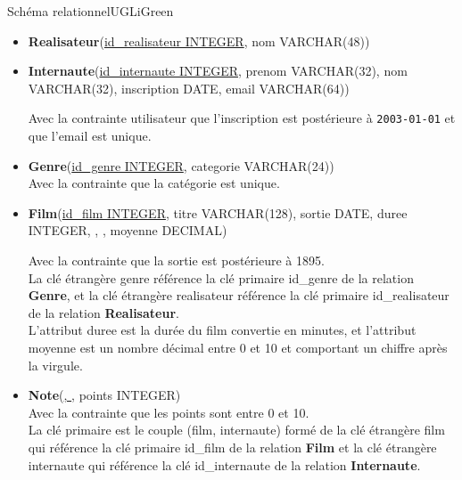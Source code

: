 \documentclass[a4paper,12pt,eval,firamath]{nsi}
\begin{document}
\begin{encadrecolore}{Schéma relationnel}{UGLiGreen}
    
    \begin{itemize}
        \item 	\textbf{Realisateur}(\uline{id\_realisateur INTEGER}, nom VARCHAR(48))\\
        \item 	\scriptsize\textbf{Internaute}(\uline{id\_internaute INTEGER}, prenom VARCHAR(32), nom VARCHAR(32), inscription DATE, email VARCHAR(64))\\\normalsize
              
              Avec la contrainte utilisateur que l'inscription est postérieure à \texttt{2003-01-01} et que l'email est unique.\\
        \item   \textbf{Genre}(\uline{id\_genre INTEGER}, categorie VARCHAR(24))\\
              
              Avec la contrainte que la catégorie est unique.\\
              
        \item  \scriptsize\textbf{Film}(\uline{id\_film INTEGER}, titre VARCHAR(128), sortie DATE, duree INTEGER, , , moyenne DECIMAL)\\\normalsize
              
              Avec la contrainte que la sortie est postérieure à 1895.\\
              La clé étrangère genre référence la clé primaire id\_genre de la relation \textbf{Genre}, et la clé étrangère realisateur référence la clé primaire id\_realisateur de la relation \textbf{Realisateur}.\\
              L'attribut duree est la durée du film convertie en minutes, et l'attribut moyenne est un nombre décimal entre 0 et 10 et comportant un chiffre après la virgule.\\
        \item \textbf{Note}(\uline{, }, points INTEGER)\\
              
              Avec la contrainte que les points sont entre 0 et 10.\\
              La clé primaire est le couple (film, internaute) formé de la clé étrangère film qui référence la clé primaire id\_film de la relation \textbf{Film} et la clé étrangère internaute qui référence la clé id\_internaute  de la relation \textbf{Internaute}.            
    \end{itemize}
\end{encadrecolore}
\end{document}
